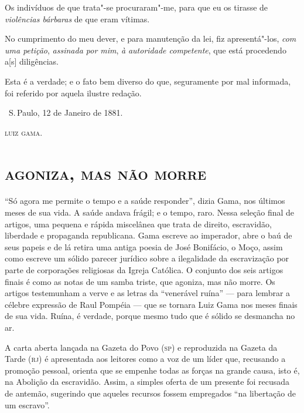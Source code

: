 Os indivíduos de que trata"-se procuraram"-me, para que eu os tirasse de
\emph{violências bárbaras} de que eram vítimas.

No cumprimento do meu dever, e para manutenção da lei, fiz
apresentá"-los, \emph{com uma petição}, \emph{assinada por mim}, \emph{à}
\emph{autoridade competente}, que está procedendo a{[}s{]} diligências.

Esta é a verdade; e o fato bem diverso do que, seguramente por mal
informada, foi referido por aquela ilustre redação.

\bigskip

\hfill\ S.\,Paulo, 12 de Janeiro de 1881.

\hfill\textsc{luiz gama.}

\paginabranca
\begingroup\makeatletter\@openrightfalse
\part{\textsc{agoniza, mas não morre}}

\mbox{}\vfill
\thispagestyle{empty}

{\small\noindent
``Só agora me permite o tempo e a saúde responder'', dizia Gama, nos
últimos meses de sua vida. A saúde andava frágil; e o tempo, raro. Nessa
seleção final de artigos, uma pequena e rápida miscelânea que trata de
direito, escravidão, liberdade e propaganda republicana. Gama escreve ao
imperador, abre o baú de seus papeis e de lá retira uma antiga poesia de
José Bonifácio, o Moço, assim como escreve um sólido parecer jurídico
sobre a ilegalidade da escravização por parte de corporações religiosas
da Igreja Católica. O conjunto dos seis artigos finais é como as notas
de um samba triste, que agoniza, mas não morre. Os artigos testemunham a
verve e as letras da ``venerável ruína'' --- para lembrar a célebre
expressão de Raul Pompéia --- que se tornara Luiz Gama nos meses finais
de sua vida. Ruína, é verdade, porque mesmo tudo que é sólido se
desmancha no ar.}
\@openrighttrue\makeatother\endgroup

\paginabranca
\mbox{}\vfill
\thispagestyle{empty}

{\small\noindent
A carta aberta lançada na Gazeta do Povo (\textsc{sp}) e reproduzida na
Gazeta da Tarde (\textsc{rj}) é apresentada aos leitores como a voz de um líder
que, recusando a promoção pessoal, orienta que se empenhe todas as
forças na grande causa, isto é, na Abolição da escravidão. Assim, a
simples oferta de um presente foi recusada de antemão, sugerindo que
aqueles recursos fossem empregados ``na libertação de um escravo''. }


